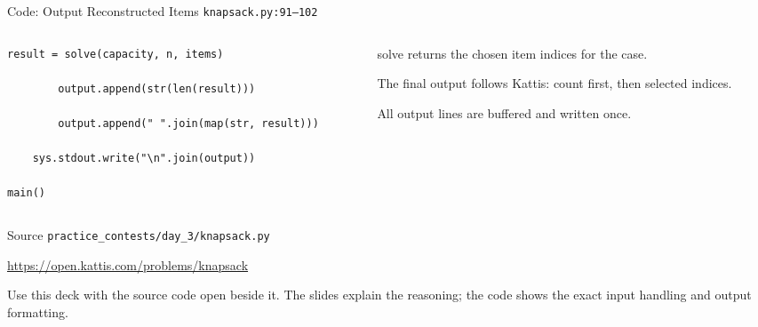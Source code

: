 \documentclass[aspectratio=169,11pt]{beamer}
\begin{document}
\begin{frame}[fragile]{Code: Output Reconstructed Items}
\scriptsize
{} \texttt{knapsack.py:91--102}

\vspace{0.08cm}
\begin{columns}[T,totalwidth=\textwidth]
\begin{column}{0.58\textwidth}
\begin{lstlisting}[style=cpcode]
        result = solve(capacity, n, items)

        output.append(str(len(result)))

        output.append(" ".join(map(str, result)))

    sys.stdout.write("\n".join(output))

main()
\end{lstlisting}
\end{column}
\begin{column}{0.38\textwidth}
\begin{tightitemize}
  \item solve returns the chosen item indices for the case.
  \item The final output follows Kattis: count first, then selected indices.
  \item All output lines are buffered and written once.
\end{tightitemize}
\end{column}
\end{columns}
\end{frame}

\begin{frame}{Source}
\small
{} \texttt{practice\_contests/day\_3/knapsack.py}

\vspace{0.3cm}
 \url{https://open.kattis.com/problems/knapsack}

\vspace{0.45cm}
Use this deck with the source code open beside it. The slides explain the reasoning; the code shows the exact input handling and output formatting.
\end{frame}
\end{document}
